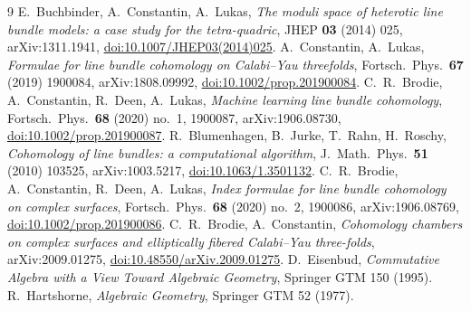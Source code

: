 \documentclass[11pt]{article}
\theoremstyle{plain}
\theoremstyle{definition}
\theoremstyle{remark}
\begin{document}
\begin{thebibliography}{9}
 E.~Buchbinder, A.~Constantin, A.~Lukas,
\emph{The moduli space of heterotic line bundle models: a case study for the tetra-quadric},
JHEP \textbf{03} (2014) 025, arXiv:1311.1941, \href{https://doi.org/10.1007/JHEP03(2014)025}{doi:10.1007/JHEP03(2014)025}.
 A.~Constantin, A.~Lukas,
\emph{Formulae for line bundle cohomology on Calabi--Yau threefolds},
Fortsch.\ Phys.\ \textbf{67} (2019) 1900084, arXiv:1808.09992, \href{https://doi.org/10.1002/prop.201900084}{doi:10.1002/prop.201900084}.
 C.~R.~Brodie, A.~Constantin, R.~Deen, A.~Lukas,
\emph{Machine learning line bundle cohomology},
Fortsch.\ Phys.\ \textbf{68} (2020) no.~1, 1900087, arXiv:1906.08730, \href{https://doi.org/10.1002/prop.201900087}{doi:10.1002/prop.201900087}.
 R.~Blumenhagen, B.~Jurke, T.~Rahn, H.~Roschy,
\emph{Cohomology of line bundles: a computational algorithm},
J.\ Math.\ Phys.\ \textbf{51} (2010) 103525, arXiv:1003.5217, \href{https://doi.org/10.1063/1.3501132}{doi:10.1063/1.3501132}.
 C.~R.~Brodie, A.~Constantin, R.~Deen, A.~Lukas,
\emph{Index formulae for line bundle cohomology on complex surfaces},
Fortsch.\ Phys.\ \textbf{68} (2020) no.~2, 1900086, arXiv:1906.08769, \href{https://doi.org/10.1002/prop.201900086}{doi:10.1002/prop.201900086}.
 C.~R.~Brodie, A.~Constantin,
\emph{Cohomology chambers on complex surfaces and elliptically fibered Calabi--Yau three-folds},
arXiv:2009.01275, \href{https://doi.org/10.48550/arXiv.2009.01275}{doi:10.48550/arXiv.2009.01275}.
 D.~Eisenbud, \emph{Commutative Algebra with a View Toward Algebraic Geometry}, Springer GTM 150 (1995).
 R.~Hartshorne, \emph{Algebraic Geometry}, Springer GTM 52 (1977).
\end{thebibliography}
\end{document}
